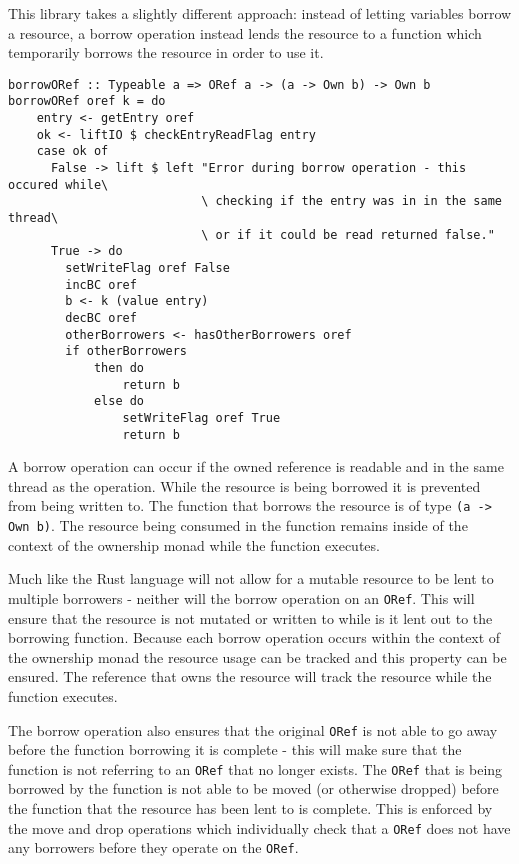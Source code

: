\documentclass[onehalf,11pt]{beavtex}
\begin{document}
This library takes a slightly different approach: instead of letting variables
borrow a resource, a borrow operation instead lends the resource to a function
which temporarily borrows the resource in order to use it.

\begin{verbatim}
borrowORef :: Typeable a => ORef a -> (a -> Own b) -> Own b
borrowORef oref k = do
    entry <- getEntry oref
    ok <- liftIO $ checkEntryReadFlag entry
    case ok of
      False -> lift $ left "Error during borrow operation - this occured while\
                           \ checking if the entry was in in the same thread\
                           \ or if it could be read returned false."
      True -> do
        setWriteFlag oref False
        incBC oref
        b <- k (value entry)
        decBC oref
        otherBorrowers <- hasOtherBorrowers oref
        if otherBorrowers
            then do
                return b
            else do
                setWriteFlag oref True
                return b
\end{verbatim}

A borrow operation can occur if the owned reference is readable and in
the same thread as the operation.
While the resource is being borrowed it is prevented from being written to.
The function that borrows the resource is of type \texttt{(a -> Own b)}. The
resource being consumed in the function remains inside of the context of the
ownership monad while the function executes.

Much like the Rust language will not allow for a mutable resource to be lent to
multiple borrowers - neither will the borrow operation on an \texttt{ORef}.
This will ensure that the resource is not mutated or written to while is it lent
out to the borrowing function.
Because each borrow operation occurs within the context of the ownership monad
the resource usage can be tracked and this property can be ensured. The
reference that owns the resource will track the resource while the function
executes.

The borrow operation also ensures that the original \texttt{ORef} is not able to
go away before the function borrowing it is complete - this will make sure that
the function is not referring to an \texttt{ORef} that no longer exists.
The \texttt{ORef} that is being borrowed by the function is not able to be moved
(or otherwise dropped) before the function that the resource has been lent to is
complete. This is enforced by the move and drop operations which individually
check that a \texttt{ORef} does not have any borrowers before they operate on
the \texttt{ORef}.
\end{document}
